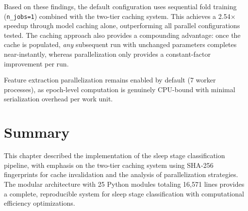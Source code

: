 Based on these findings, the default configuration uses sequential fold training (\texttt{n\_jobs=1}) combined with the two-tier caching system. This achieves a 2.54$\times$ speedup through model caching alone, outperforming all parallel configurations tested. The caching approach also provides a compounding advantage: once the cache is populated, \emph{any} subsequent run with unchanged parameters completes near-instantly, whereas parallelization only provides a constant-factor improvement per run.

Feature extraction parallelization remains enabled by default (7 worker processes), as epoch-level computation is genuinely CPU-bound with minimal serialization overhead per work unit.

\section{Summary}
\label{sec:impl_summary}

This chapter described the implementation of the sleep stage classification pipeline, with emphasis on the two-tier caching system using SHA-256 fingerprints for cache invalidation and the analysis of parallelization strategies. The modular architecture with 25 Python modules totaling 16,571 lines provides a complete, reproducible system for sleep stage classification with computational efficiency optimizations.
